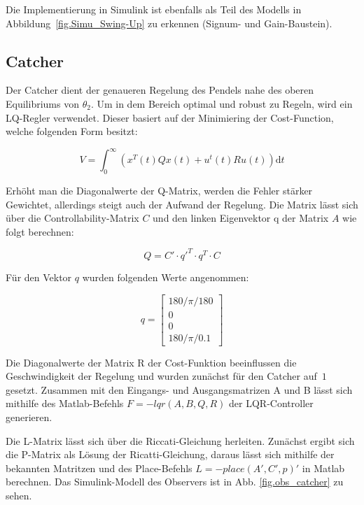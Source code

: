 Die Implementierung in Simulink ist ebenfalls als Teil des Modells in Abbildung~\ref{fig.Simu_Swing-Up} zu erkennen (Signum- und Gain-Baustein).


\subsection{Catcher}
\label{catcher} 

Der Catcher dient der genaueren Regelung des Pendels nahe des oberen Equilibriums von $ \theta_2 $. Um in dem Bereich optimal und robust zu Regeln, wird ein LQ-Regler verwendet. Dieser basiert auf der Minimiering der Cost-Function, welche folgenden Form besitzt:

\begin{equation}
 V = \int_0^\infty \! (x^T(t) Qx(t) + u^t(t) R u(t))  \mathrm{d}t
\end{equation}

Erhöht man die Diagonalwerte der Q-Matrix, werden die Fehler stärker Gewichtet, allerdings steigt auch der Aufwand der Regelung. Die Matrix lässt sich über die Controllability-Matrix $C$ und den linken Eigenvektor q der Matrix $A$
wie folgt berechnen:

\begin{equation}
 Q = C' \cdot q'^T \cdot q^T \cdot C
\end{equation}

Für den Vektor $q$ wurden folgenden Werte angenommen:

\begin{equation}
q =\begin{bmatrix}
         180/\pi/180 \\
         0\\
         0\\
         180/\pi/0.1
        \end{bmatrix}
\end{equation}
 
Die Diagonalwerte der Matrix R der Cost-Funktion beeinflussen die Geschwindigkeit der Regelung und wurden zunächst für den Catcher auf~$1$ gesetzt.
Zusammen mit den Eingangs- und Ausgangsmatrizen A und B lässt sich mithilfe des Matlab-Befehls $F = -lqr(A,B,Q,R)$ der LQR-Controller generieren.

Die L-Matrix lässt sich über die Riccati-Gleichung \cite{Werner.2013} herleiten. Zunächst ergibt sich die P-Matrix als Lösung der Ricatti-Gleichung, daraus lässt sich mithilfe der bekannten Matritzen und des Place-Befehls $L=-place(A',C',p)'$ in Matlab berechnen.
Das Simulink-Modell des Observers ist in Abb. \ref{fig.obs_catcher} zu sehen.

